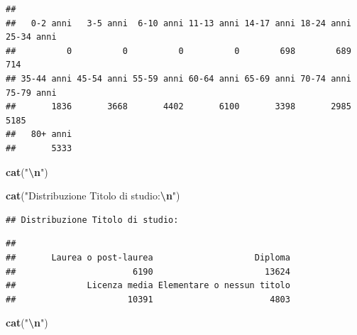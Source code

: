 \documentclass[
]{article}
\newenvironment{Shaded}{\begin{snugshade}}{\end{snugshade}}
\newcommand{\FunctionTok}[1]{\textcolor[rgb]{0.13,0.29,0.53}{\textbf{#1}}}
\newcommand{\NormalTok}[1]{#1}
\newcommand{\SpecialCharTok}[1]{\textcolor[rgb]{0.81,0.36,0.00}{\textbf{#1}}}
\newcommand{\StringTok}[1]{\textcolor[rgb]{0.31,0.60,0.02}{#1}}
\begin{document}
\begin{verbatim}
## 
##   0-2 anni   3-5 anni  6-10 anni 11-13 anni 14-17 anni 18-24 anni 25-34 anni 
##          0          0          0          0        698        689        714 
## 35-44 anni 45-54 anni 55-59 anni 60-64 anni 65-69 anni 70-74 anni 75-79 anni 
##       1836       3668       4402       6100       3398       2985       5185 
##   80+ anni 
##       5333
\end{verbatim}

\begin{Shaded}
\begin{Highlighting}[]
\FunctionTok{cat}\NormalTok{(}\StringTok{"}\SpecialCharTok{\textbackslash{}n}\StringTok{"}\NormalTok{)}
\end{Highlighting}
\end{Shaded}

\begin{Shaded}
\begin{Highlighting}[]
\FunctionTok{cat}\NormalTok{(}\StringTok{"Distribuzione Titolo di studio:}\SpecialCharTok{\textbackslash{}n}\StringTok{"}\NormalTok{)}
\end{Highlighting}
\end{Shaded}

\begin{verbatim}
## Distribuzione Titolo di studio:
\end{verbatim}

\begin{Shaded}
\end{Shaded}

\begin{verbatim}
## 
##       Laurea o post-laurea                    Diploma 
##                       6190                      13624 
##              Licenza media Elementare o nessun titolo 
##                      10391                       4803
\end{verbatim}

\begin{Shaded}
\begin{Highlighting}[]
\FunctionTok{cat}\NormalTok{(}\StringTok{"}\SpecialCharTok{\textbackslash{}n}\StringTok{"}\NormalTok{)}
\end{Highlighting}
\end{Shaded}
\end{document}
